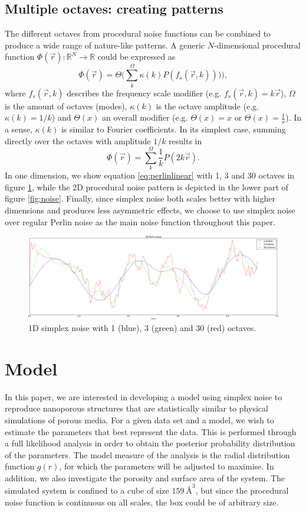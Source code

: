 \documentclass[aps,pre,twocolumn,letterpaper,floatfix,showpacs]{revtex4}
\begin{document}
\subsection{Multiple octaves: creating patterns}
\label{sec:octaves}
The different octaves from procedural noise functions can be combined
to produce a wide range of nature-like patterns. A generic
$N$-dimensional procedural function $\Phi(\vec r): \mathbb R^N \to
\mathbb R$ could be expressed as
\begin{equation}
\label{eq:procedural}
 \Phi(\vec r) = \Theta \Big(\sum_k^\Omega \kappa (k) P(  f_s (\vec r,k) )) \Big),
 \end{equation}
where $f_s(\vec r,k)$ describes the frequency scale modifier (e.g. $f_s(\vec r,k) =
k\vec r$), $\Omega$ is the amount of octaves (modes), $\kappa(k)$ is the octave amplitude (e.g. $\kappa(k) = 1/k$)
and $\Theta(x)$ an overall modifier (e.g. $\Theta(x) = x$ or
$\Theta(x) = \frac{1}{x}$). In a sense, $\kappa(k)$ is similar to Fourier coefficients. 
In its simplest case, summing directly over the octaves with amplitude $1/k$ results in 
\begin{equation}
\label{eq:perlinlinear}
 \Phi(\vec r) = \sum_k^\Omega \frac{1}{k} P( 2k\vec r).
\end{equation}
In one dimension, we show equation \ref{eq:perlinlinear} with 1, 3 and 30 octaves
in figure \ref{fig:1dperlin}, while the 2D procedural noise pattern is depicted in the lower
part of figure \ref{fig:noise}. Finally, since simplex noise both scales better
with higher dimensions and produces less asymmetric effects, we choose to use
simplex noise over regular Perlin noise as the main noise function throughout this paper.

\begin{figure}
\includegraphics[width=.5\textwidth]{1d_perlin.png}
\caption{1D simplex noise with 1 (blue), 3 (green) and 30 (red) octaves. }
\label{fig:1dperlin}
\end{figure}


\section{Model}
In this paper, we are interested in developing a model using simplex noise to reproduce
nanoporous structures that are statistically similar to physical simulations of porous media.
For a given data set and a model, we wish to estimate the parameters that best represent the data. 
This is performed through a full likelihood analysis in order to obtain the posterior
probability distribution of the parameters. 
The model measure of the analysis is the radial distribution function $g(r)$, for
which the parameters will be adjusted to maximise.
In addition, we also investigate the porosity and surface area of the system. 
The simulated system is confined to a cube of size $\SI{159} {\angstrom}^3$, but since
the procedural noise function is continuous on all scales, the box could be of arbitrary size. 
\end{document}
